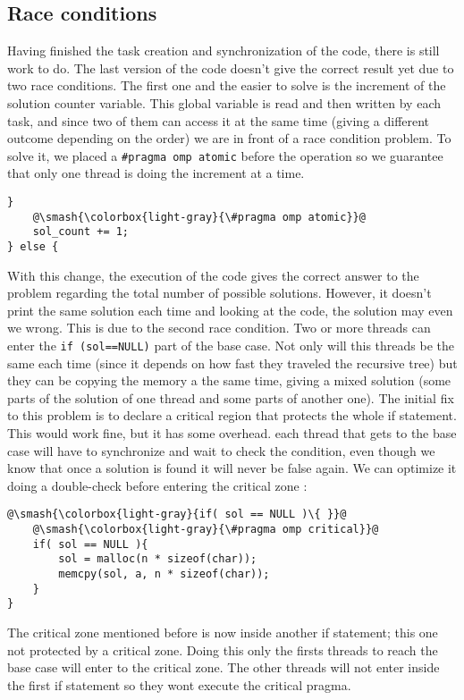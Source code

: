 \subsection{Race conditions}
Having finished the task creation and synchronization of the code, there is still work to do. The last version of the code doesn't give the correct result yet due to two race conditions. The first one and the easier to solve is the increment of the solution counter variable. This global variable is read and then written by each task, and since two of them can access it at the same time (giving a different outcome depending on the order) we are in front of a race condition problem.
\justify
To solve it, we placed a \texttt{\#pragma omp atomic} before the operation so we guarantee that only one thread is doing the increment at a time.
\begin{lstlisting}[escapechar=@]
    }
    @\smash{\colorbox{light-gray}{\#pragma omp atomic}}@
    sol_count += 1;
} else {
\end{lstlisting}
\justify
With this change, the execution of the code gives the correct answer to the problem regarding the total number of possible solutions. However, it doesn't print the same solution each time and looking at the code, the solution may even we wrong.
\justify
This is due to the second race condition. Two or more threads can enter the \texttt{if (sol==NULL)} part of the base case. Not only will this threads be the same each time (since it depends on how fast they traveled the recursive tree) but they can be copying the memory a the same time, giving a mixed solution (some parts of the solution of one thread and some parts of another one).
\justify
The initial fix to this problem is to declare a critical region that protects the whole if statement. This would work fine, but it has some overhead. each thread that gets to the base case will have to synchronize and wait to check the condition, even though we know that once a solution is found it will never be false again. We can optimize it doing a double-check before entering the critical zone : 
\begin{lstlisting}[escapechar=@]
@\smash{\colorbox{light-gray}{if( sol == NULL )\{ }}@
    @\smash{\colorbox{light-gray}{\#pragma omp critical}}@
    if( sol == NULL ){
        sol = malloc(n * sizeof(char));
        memcpy(sol, a, n * sizeof(char));
    }
}
\end{lstlisting}
\justify
The critical zone mentioned before is now inside another if statement; this one not protected by a critical zone. Doing this only the firsts threads to reach the base case will enter to the critical zone. The other threads will not enter inside the first if statement so they wont execute the critical pragma.
